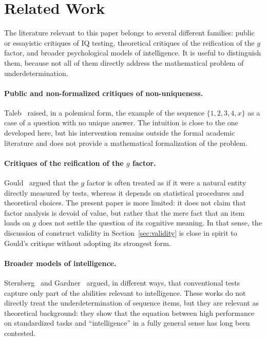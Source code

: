 \documentclass[10pt, a4paper]{article}
\theoremstyle{plain}
\theoremstyle{definition}
\theoremstyle{remark}
\begin{document}
\section{Related Work}
\label{sec:related}

The literature relevant to this paper belongs to several different families:
public or essayistic critiques of IQ testing, theoretical critiques of the
reification of the $g$ factor, and broader psychological models of intelligence.
It is useful to distinguish them, because not all of them directly address the
mathematical problem of underdetermination.

\paragraph{Public and non-formalized critiques of non-uniqueness.}
Taleb~\cite{taleb2019} raised, in a polemical form, the example of the sequence
$\{1, 2, 3, 4, x\}$ as a case of a question with no unique answer. The
intuition is close to the one developed here, but his intervention remains
outside the formal academic literature and does not provide a mathematical
formalization of the problem.

\paragraph{Critiques of the reification of the $g$ factor.}
Gould~\cite{gould1981} argued that the $g$ factor is often treated as if it were
a natural entity directly measured by tests, whereas it depends on statistical
procedures and theoretical choices. The present paper is more limited: it does
not claim that factor analysis is devoid of value, but rather that the mere fact
that an item loads on $g$ does not settle the question of its cognitive meaning.
In that sense, the discussion of construct validity in Section~\ref{sec:validity}
is close in spirit to Gould's critique without adopting its strongest form.

\paragraph{Broader models of intelligence.}
Sternberg~\cite{sternberg1985, sternberg1999} and Gardner~\cite{gardner1983}
argued, in different ways, that conventional tests capture only part of the
abilities relevant to intelligence. These works do not directly treat the
underdetermination of sequence items, but they are relevant as theoretical
background: they show that the equation between high performance on standardized
tasks and ``intelligence'' in a fully general sense has long been contested.
\end{document}
